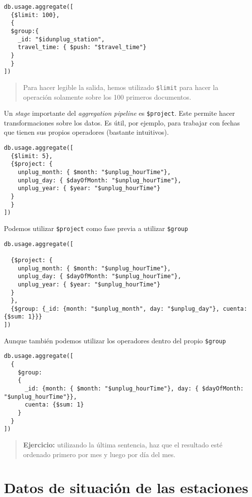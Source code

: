 \documentclass[]{article}
\begin{document}
\begin{verbatim}
db.usage.aggregate([
  {$limit: 100},
  {
  $group:{
    _id: "$idunplug_station",
    travel_time: { $push: "$travel_time"}
  }
  }
])
\end{verbatim}

\begin{quote}
Para hacer legible la salida, hemos utilizado \texttt{\$limit} para
hacer la operación solamente sobre los 100 primeros documentos.
\end{quote}

Un \emph{stage} importante del \emph{aggregation pipeline} es
\texttt{\$project}. Este permite hacer transformaciones sobre los datos.
Es útil, por ejemplo, para trabajar con fechas que tienen sus propios
operadores (bastante intuitivos).

\begin{verbatim}
db.usage.aggregate([
  {$limit: 5},
  {$project: {
    unplug_month: { $month: "$unplug_hourTime"},
    unplug_day: { $dayOfMonth: "$unplug_hourTime"},
    unplug_year: { $year: "$unplug_hourTime"}
  }
  }
])
\end{verbatim}

Podemos utilizar \texttt{\$project} como fase previa a utilizar
\texttt{\$group}

\begin{verbatim}
db.usage.aggregate([

  {$project: {
    unplug_month: { $month: "$unplug_hourTime"},
    unplug_day: { $dayOfMonth: "$unplug_hourTime"},
    unplug_year: { $year: "$unplug_hourTime"}
  }
  },
  {$group: {_id: {month: "$unplug_month", day: "$unplug_day"}, cuenta: {$sum: 1}}}
])
\end{verbatim}

Aunque también podemos utilizar los operadores dentro del propio
\texttt{\$group}

\begin{verbatim}
db.usage.aggregate([
  {
    $group: 
    {
      _id: {month: { $month: "$unplug_hourTime"}, day: { $dayOfMonth: "$unplug_hourTime"}},
      cuenta: {$sum: 1}
    }
  }
])
\end{verbatim}

\begin{quote}
\textbf{Ejercicio:} utilizando la última sentencia, haz que el resultado
esté ordenado primero por mes y luego por día del mes.
\end{quote}

\hypertarget{datos-de-situacion-de-las-estaciones}{%
\section{Datos de situación de las
estaciones}\label{datos-de-situacion-de-las-estaciones}}
\end{document}
